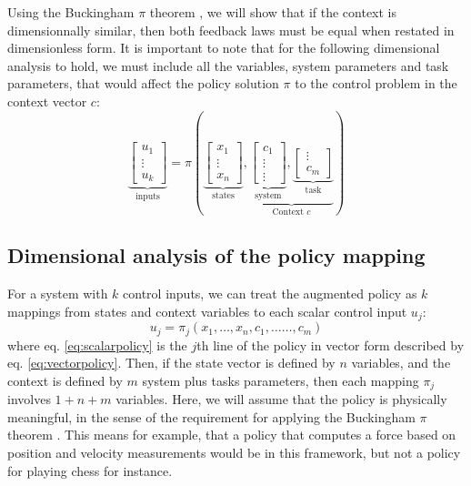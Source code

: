 Using the Buckingham $\pi$ theorem \cite{buckingham_physically_1914}, we will show that if the context is dimensionnally similar, then both feedback laws must be equal when restated in dimensionless form. It is important to note that for the following dimensional analysis to hold, we must include all the variables, system parameters and task parameters, that would affect the policy solution $\pi$ to the control problem in the context vector $c$:
\begin{equation}
\underbrace{\begin{bmatrix}
u_1 \\
\vdots \\
u_k
\end{bmatrix}}_{\text{inputs}}
=
\pi \left(
\underbrace{\begin{bmatrix}
x_1 \\
\vdots \\
x_n
\end{bmatrix}}_{\text{states}}
,
\underbrace{
\underbrace{\begin{bmatrix}
c_1 \\
\vdots \\
\vdots 
\end{bmatrix}}_{\text{system}}
,
\underbrace{\begin{bmatrix}
\vdots \\
c_{m}
\end{bmatrix}}_{\text{task}}
}_{\text{Context $c$}}
\right) 
\label{eq:vectorpolicy}
\end{equation}

\subsection{Dimensional analysis of the policy mapping}

For a system with $k$ control inputs, we can treat the augmented policy as $k$ mappings from states and context variables to each scalar control input $u_j$:
\begin{equation}
u_j = \pi_j \left(
x_1, \hdots, x_n, 
c_1, \hdots \hdots, c_{m}
\right) 
\label{eq:scalarpolicy}
\end{equation}
where eq. \eqref{eq:scalarpolicy} is the $j$th line of the policy in vector form described by eq. \eqref{eq:vectorpolicy}.
Then, if the state vector is defined by $n$ variables, and the context is defined by $m$ system plus tasks parameters, then each mapping $\pi_j$ involves $1 + n + m $ variables. Here, we will assume that the policy is physically meaningful, in the sense of the requirement for applying the Buckingham $\pi$ theorem \cite{buckingham_physically_1914}. This means for example, that a policy that computes a force based on position and velocity measurements would be in this framework, but not a policy for playing chess for instance. 

